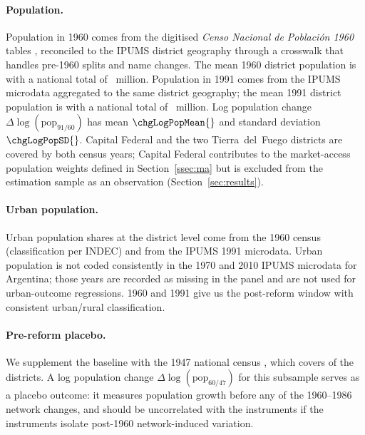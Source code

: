 \paragraph{Population.}
Population in 1960 comes from the digitised \emph{Censo Nacional de
Población 1960} tables \citep{censo1960pop}, reconciled to the IPUMS district geography
through a crosswalk that handles pre-1960 splits and name changes. The
mean 1960 district population is \popMeanBase{} with a national total of
\popTotalBase{}~million. Population in 1991 comes from the IPUMS microdata
aggregated to the same district geography; the mean 1991 district population is
\popMeanEnd{} with a national total of \popTotalEnd{}~million. Log population change
$\Delta\log(\mathrm{pop}_{91/60})$ has mean $\chgLogPopMean{}$ and standard deviation
$\chgLogPopSD{}$. Capital Federal and the two Tierra~del~Fuego districts are
covered by both census years; Capital Federal contributes to the
market-access population weights defined in Section~\ref{ssec:ma} but
is excluded from the estimation sample as an observation
(Section~\ref{sec:results}).

\paragraph{Urban population.}
Urban population shares at the district level come from the 1960
census (classification per INDEC) and from the IPUMS 1991 microdata.
Urban population is not coded consistently in the 1970 and 2010 IPUMS
microdata for Argentina; those years are recorded as missing in the
panel and are not used for urban-outcome regressions. 1960 and 1991 give
us the post-reform window with consistent urban/rural classification.

\paragraph{Pre-reform placebo.}
We supplement the baseline with the 1947 national census
\citep{censo1947}, which covers
\placeboCoverage{} of the \nDistricts{} districts. A log population change
$\Delta\log(\mathrm{pop}_{60/47})$ for this subsample serves as a placebo
outcome: it measures population growth before any of the 1960--1986
network changes, and should be uncorrelated with the instruments if the
instruments isolate post-1960 network-induced variation.

